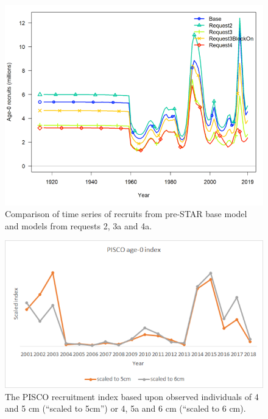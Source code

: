 \documentclass[12pt,]{article}
\begin{document}
\begin{figure}
\centering
\includegraphics{Figures/STAR_request4.png}
\caption{Comparison of time series of recruits from pre-STAR base model
and models from requests 2, 3a and 4a. \label{fig:STAR_request4}}
\end{figure}

\FloatBarrier

\begin{figure}
\centering
\includegraphics{Figures/STAR_request8.png}
\caption{The PISCO recruitment index based upon observed individuals of
4 and 5 cm (``scaled to 5cm'') or 4, 5a and 6 cm (``scaled to 6 cm).
\label{fig:STAR_request8}}
\end{figure}

\FloatBarrier
\end{document}
